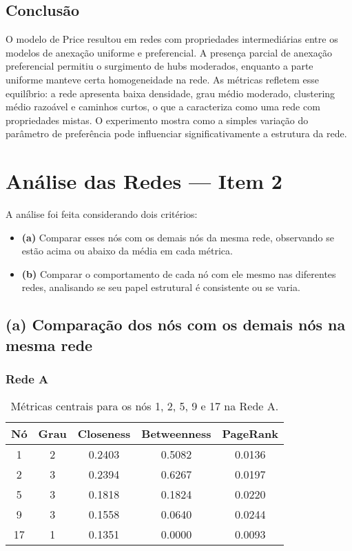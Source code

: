 \documentclass[a4paper]{article}
\begin{document}
\newpage

\subsection*{Conclusão}

O modelo de Price resultou em redes com propriedades intermediárias entre os modelos de anexação uniforme e preferencial. A presença parcial de anexação preferencial permitiu o surgimento de hubs moderados, enquanto a parte uniforme manteve certa homogeneidade na rede. As métricas refletem esse equilíbrio: a rede apresenta baixa densidade, grau médio moderado, clustering médio razoável e caminhos curtos, o que a caracteriza como uma rede com propriedades mistas. O experimento mostra como a simples variação do parâmetro de preferência pode influenciar significativamente a estrutura da rede.

\newpage

\section*{Análise das Redes — Item 2}

A análise foi feita considerando dois critérios:

\begin{itemize}
    \item \textbf{(a)} Comparar esses nós com os demais nós da mesma rede, observando se estão acima ou abaixo da média em cada métrica.
    \item \textbf{(b)} Comparar o comportamento de cada nó com ele mesmo nas diferentes redes, analisando se seu papel estrutural é consistente ou se varia.
\end{itemize}

\subsection*{(a) Comparação dos nós com os demais nós na mesma rede}

\subsubsection{Rede A}

\begin{table}[h]
\centering
\begin{tabular}{|c|c|c|c|c|}
\hline
\textbf{Nó} & \textbf{Grau} & \textbf{Closeness} & \textbf{Betweenness} & \textbf{PageRank} \\
\hline
1  & 2 & 0.2403 & 0.5082 & 0.0136 \\
2  & 3 & 0.2394 & 0.6267 & 0.0197 \\
5  & 3 & 0.1818 & 0.1824 & 0.0220 \\
9  & 3 & 0.1558 & 0.0640 & 0.0244 \\
17 & 1 & 0.1351 & 0.0000 & 0.0093 \\
\hline
\end{tabular}
\caption{Métricas centrais para os nós 1, 2, 5, 9 e 17 na Rede A.}
\end{table}
\end{document}
